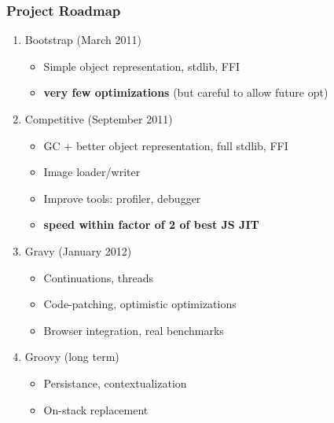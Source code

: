 \begin{frame}
\frametitle{\bf Project Roadmap}
    \begin{enumerate}[1.]
        \item Bootstrap (March 2011)
        \begin{itemize}
            \item Simple object representation, stdlib, FFI
            \item {\bf very few optimizations} (but careful to allow future opt)
        \end{itemize}

        \item Competitive (September 2011)
        \begin{itemize}
            \item GC + better object representation, full stdlib, FFI
            \item Image loader/writer
            \item Improve tools: profiler, debugger
            \item {\bf speed within factor of 2 of best JS JIT}
        \end{itemize}

        \item Gravy (January 2012)
        \begin{itemize}
            \item Continuations, threads
            \item Code-patching, optimistic optimizations
            \item Browser integration, real benchmarks
        \end{itemize}

        \item Groovy (long term)
        \begin{itemize}
            \item Persistance, contextualization
            \item On-stack replacement
        \end{itemize}
    \end{enumerate}
\end{frame}

